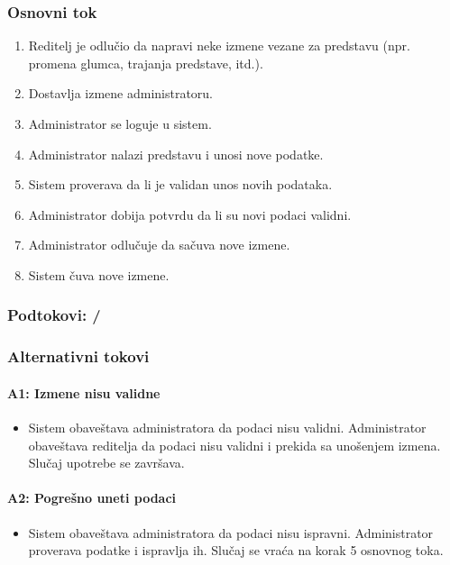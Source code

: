 \subsubsection*{Osnovni tok}
\begin{enumerate}
    \item Reditelj je odlučio da napravi neke izmene vezane za predstavu (npr. promena glumca, trajanja predstave, itd.).
    \item Dostavlja izmene administratoru.
    \item Administrator se loguje u sistem.
    \item Administrator nalazi predstavu i unosi nove podatke.
    \item Sistem proverava da li je validan unos novih podataka.
    \item Administrator dobija potvrdu da li su novi podaci validni.
    \item Administrator odlučuje da sačuva nove izmene.
    \item Sistem čuva nove izmene.
\end{enumerate}

\subsubsection*{Podtokovi: /}

\subsubsection*{Alternativni tokovi}

\paragraph*{A1: Izmene nisu validne}
\begin{itemize}
    \item Sistem obaveštava administratora da podaci nisu validni. Administrator obaveštava reditelja da podaci nisu validni i prekida sa unošenjem izmena. Slučaj upotrebe se završava.
\end{itemize}

\paragraph*{A2: Pogrešno uneti podaci}
\begin{itemize}
    \item Sistem obaveštava administratora da podaci nisu ispravni. Administrator proverava podatke i ispravlja ih. Slučaj se vraća na korak 5 osnovnog toka.
\end{itemize}

